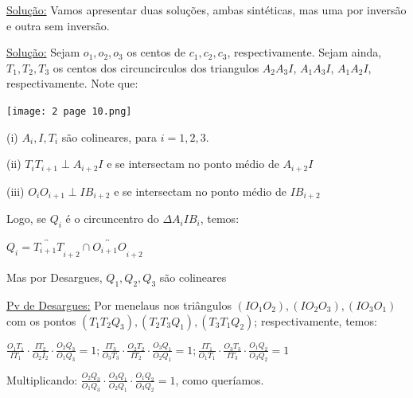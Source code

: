 \documentclass[a4paper,12pt]{article}
\theoremstyle{plain} %
\theoremstyle{definition} %
\theoremstyle{remark} %
\begin{document}
	\begin{framed}
		\underline{Solu\c{c}\~ao:} Vamos apresentar duas solu\c{c}\~oes, ambas sint\'eticas, mas uma por invers\~ao e outra sem invers\~ao.
		
		\underline{Solu\c{c}\~ao:} Sejam $o_1, o_2, o_3$ os centos de $c_1, c_2, c_3$, respectivamente. Sejam ainda, $T_1, T_2, T_3$ os centos dos circuncirculos dos triangulos $A_2 A_3 I$, $A_1 A_3 I$, $A_1 A_2 I$, respectivamente. Note que:
		
		\vspace{1em} 
		
		\begin{center}
			\texttt{[image: 2 page 10.png]}
		\end{center}
		
		(i) $A_i, I, T_i$ s\~ao colineares, para $i=1, 2, 3$.
		
		(ii) $T_i T_{i+1} \perp A_{i+2}I$ e se intersectam no ponto m\'edio de $A_{i+2}I$
		
		(iii) $O_i O_{i+1} \perp I B_{i+2}$ e se intersectam no ponto m\'edio de $IB_{i+2}$
		
		Logo, se $Q_i$ \'e o circuncentro do $\Delta A_iIB_i$, temos:
		
		\begin{center}
			$Q_i=\overleftrightarrow{T_{i+1}T}_{i+2}\cap \overleftrightarrow{O_{i+1}O}_{i+2}$
		\end{center}
		
		Mas por Desargues, $Q_1, Q_2, Q_3$ s\~ao colineares
		
		\underline{Pv de Desargues:} Por menelaus nos tri\^angulos $(IO_1O_2), (IO_2O_3), (IO_3O_1)$ com os pontos $(T_1T_2Q_3), (T_2T_3Q_1), (T_3T_1Q_2)$; respectivamente, temos:
		
		\vspace{1em}
		$\displaystyle\frac{O_{1} T_{1}}{I T_{1}} \cdot \frac{I T_{2}}{O_{2} I_{2}} \cdot \frac{O_{2} Q_{3}}{O_{1} Q_{3}}=1; \frac{I T_{3}}{O_{3} T_{3}} \cdot \frac{O_{2} T_{2}}{I T_{2}} \cdot \frac{O_{3} Q_{1}}{O_{2} Q_{1}}=1; \frac{I T_{1}}{O_{1} T_{1}} \cdot \frac{O_{3} T_{3}}{I T_{3}} \cdot \frac{O_{1} Q_{2}}{O_{3} Q_{2}}=1$
		
		Multiplicando: $\displaystyle\frac{O_{2} Q_{3}}{O_{1} Q_{3}} \cdot \frac{O_{3} Q_{1}}{O_{2} Q_{1}} \cdot \frac{O_{1} Q_{2}}{O_{3} Q_{2}}=1$, como quer\'iamos. \tiny\textblock
		
		\normalsize 
		
		\vspace{1em} 
	\end{framed}
	
\end{document}
